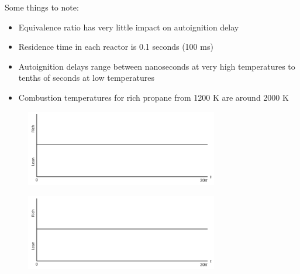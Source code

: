 \documentclass[11pt]{article}
\begin{document}
\begin{itemize}
Some things to note:
\begin{itemize}
\item Equivalence ratio has very little impact on autoignition delay
\item Residence time in each reactor is 0.1 seconds (100 ms)
\item Autoignition delays range between nanoseconds at very high temperatures to tenths of seconds at low temperatures
\item Combustion temperatures for rich propane from 1200 K are around 2000 K
\end{itemize}
\begin{figure}[h]
\centering
\includegraphics[width=0.75\textwidth]{Graphics/RQL_time_axes.PNG}
\end{figure}
\begin{figure}[h]
\centering
\includegraphics[width=0.75\textwidth]{Graphics/RQL_time_axes.PNG}
\end{figure}


\end{itemize}
\end{document}
